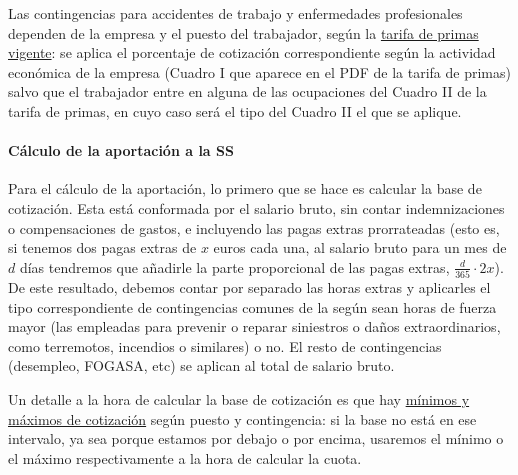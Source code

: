 \documentclass[nochap,palatino,shortheader]{apuntes}
\begin{document}
Las contingencias para accidentes de trabajo y enfermedades profesionales dependen de la empresa y el puesto del trabajador, según la \href{http://www.seg-social.es/Internet_1/Trabajadores/CotizacionRecaudaci10777/TarifadePrimasdeATy48410/index.htm}{tarifa de primas vigente}: se aplica el porcentaje de cotización correspondiente según la actividad económica de la empresa (Cuadro I que aparece en el PDF de la tarifa de primas) salvo que el trabajador entre en alguna de las ocupaciones del Cuadro II de la tarifa de primas, en cuyo caso será el tipo del Cuadro II el que se aplique.

\paragraph{Cálculo de la aportación a la SS} Para el cálculo de la aportación, lo primero que se hace es calcular la base de cotización. Esta está conformada por el salario bruto, sin contar indemnizaciones o compensaciones de gastos\footnotemark, e incluyendo las pagas extras prorrateadas (esto es, si tenemos dos pagas extras de $x$ euros cada una, al salario bruto para un mes de $d$ días tendremos que añadirle la parte proporcional de las pagas extras, $\frac{d}{365} \cdot 2x $). De este resultado, debemos contar por separado las horas extras y aplicarles el tipo correspondiente de contingencias comunes de la  según sean horas de fuerza mayor (las empleadas para prevenir o reparar siniestros o daños extraordinarios, como terremotos, incendios o similares) o no. El resto de contingencias (desempleo, FOGASA, etc) se aplican al total de salario bruto.

Un detalle a la hora de calcular la base de cotización es que hay \href{http://www.seg-social.es/Internet_1/Trabajadores/CotizacionRecaudaci10777/Basesytiposdecotiza36537/index.htm}{mínimos y máximos de cotización} según puesto y contingencia: si la base no está en ese intervalo, ya sea porque estamos por debajo o por encima, usaremos el mínimo o el máximo respectivamente a la hora de calcular la cuota.

\end{document}
